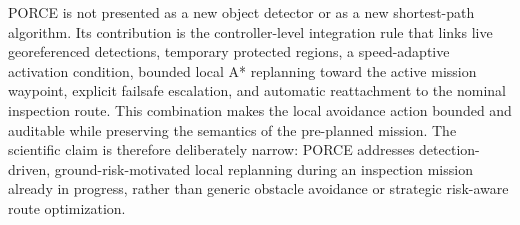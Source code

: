 \documentclass[electronics,article,submit,moreauthors]{Definitions/mdpi}
\DeclareRobustCommand{\deleted}[1]{}%
\DeclareRobustCommand{\added}[1]{#1}%
\DeclareRobustCommand{\deleted}[1]{\textcolor{black}{\sout{#1}}}
\DeclareRobustCommand{\added}[1]{\textcolor{green!50!black}{#1}}
\def\deleted#1{}%
\def\added#1{#1}%
\begin{document}
\deleted{This paper focuses on Path Planning and Obstacle Avoidance Regulatory Compliant Evasion (PORCE) as the main scientific contribution. Its role is simple but operationally important: whenever an obstacle enters a conservative reaction horizon, the method temporarily inhibits nominal navigation, computes a}\added{PORCE is not presented as a new object detector or as a new shortest-path algorithm. Its contribution is the controller-level integration rule that links live georeferenced detections, temporary protected regions, a speed-adaptive activation condition,} bounded local \deleted{path}\added{A* replanning} toward the \deleted{current}\added{active} mission waypoint, \deleted{and returns control}\added{explicit failsafe escalation, and automatic reattachment} to the \deleted{original}\added{nominal inspection} route\deleted{ as soon as}\added{. This combination makes} the local \deleted{conflict disappears. The novelty}\added{avoidance action bounded and auditable while preserving the semantics of the pre-planned mission. The scientific claim} is therefore \deleted{not obstacle avoidance in isolation. The novelty is to operationalize a regulatory-aware no-overflight logic for uninvolved third parties and nearby protected entities inside a deterministic, online local replanner. The work is therefore intentionally framed within this EASA-relevant operational niche, where the proposed method advances the state of the art}\added{deliberately narrow: PORCE addresses detection-driven, ground-risk-motivated local replanning during an inspection mission already in progress}, rather than \deleted{as a universal solution intended to supersede existing approaches to }generic \deleted{UAV}\added{obstacle} avoidance or \added{strategic }risk-aware route \deleted{planning.}\added{optimization.}
\end{document}
